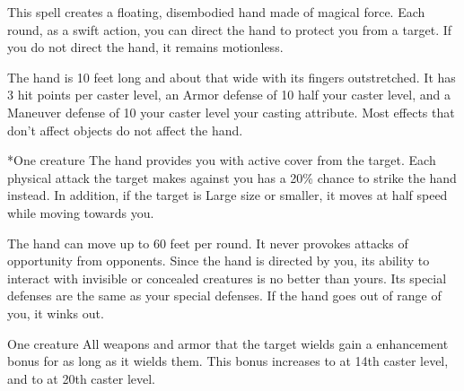 \begin{spellheader}
    \spellrng{\rngmed}
    \spelldur{\durshort \dismissable}
\end{spellheader}
\begin{spelleffects}
    \spellline
    \spelleffect This spell creates a floating, disembodied hand made of magical force. Each round, as a swift action, you can direct the hand to protect you from a target. If you do not direct the hand, it remains motionless.

    The hand is 10 feet long and about that wide with its fingers outstretched. It has 3 hit points per caster level, an Armor defense of 10 \add half your caster level, and a Maneuver defense of 10 \add your caster level \add your casting attribute. Most effects that don't affect objects do not affect the hand.

    \begin{spelltarget}*{One creature}
        \spelleffect The hand provides you with active cover from the target. Each physical attack the target makes against you has a 20\% chance to strike the hand instead. In addition, if the target is Large size or smaller, it moves at half speed while moving towards you.
    \end{spelltarget}
\end{spelleffects}
\begin{spellfooter}
    \spellnotes The hand can move up to 60 feet per round. It never provokes attacks of opportunity from opponents. Since the hand is directed by you, its ability to interact with invisible or concealed creatures is no better than yours. Its special defenses are the same as your special defenses. If the hand goes out of range of you, it winks out.
\end{spellfooter}

\begin{spellheader}
    \spellrng{\rngclose}
    \spelldur{\durshort}
\end{spellheader}
\begin{spelleffects}
    \begin{spelltarget}{One creature}
        \spelleffect All weapons and armor that the target wields gain a  enhancement bonus for as long as it wields them. This bonus increases to  at 14th caster level, and to  at 20th caster level.
    \end{spelltarget}
\end{spelleffects}

